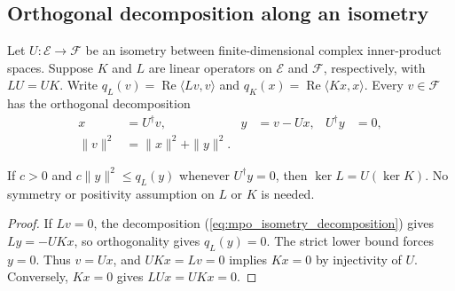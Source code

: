\subsection{Orthogonal decomposition along an isometry}

Let $U:\mathcal E\to\mathcal F$ be an isometry between finite-dimensional
complex inner-product spaces. Suppose $K$ and $L$ are linear operators
on $\mathcal E$ and $\mathcal F$, respectively, with $LU=UK$.
Write $q_L(v)=\operatorname{Re}\langle Lv,v\rangle$ and
$q_K(x)=\operatorname{Re}\langle Kx,x\rangle$.
Every $v\in\mathcal F$ has the orthogonal decomposition
\begin{align}
    x       & =U^\dagger v,     & y & =v-Ux, & U^\dagger y & =0,
    \label{eq:mpo_isometry_decomposition}                        \\
    \|v\|^2 & =\|x\|^2+\|y\|^2.
    \label{eq:mpo_isometry_norm_split}
\end{align}

\begin{lemma}
    \label{thm:mpo_isometry_abstract_kernel}
    \leanok
    If $c>0$ and $c\|y\|^2\leq q_L(y)$ whenever $U^\dagger y=0$,
    then $\ker L=U(\ker K)$. No symmetry or positivity assumption on
    $L$ or $K$ is needed.
\end{lemma}
\begin{proof}\leanok
    If $Lv=0$, the decomposition (\ref{eq:mpo_isometry_decomposition}) gives
    $Ly=-UKx$, so orthogonality gives $q_L(y)=0$. The strict lower
    bound forces $y=0$. Thus $v=Ux$, and $UKx=Lv=0$ implies $Kx=0$
    by injectivity of $U$. Conversely, $Kx=0$ gives $LUx=UKx=0$.
\end{proof}

